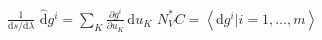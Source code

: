 \documentclass{article}
\begin{document}
$\frac{1}{\mathrm{d}s/\mathrm{d}\lambda}$
$\hat{\mathrm{d}}g^i=\sum_K\frac{\partial g^i}{\partial u_K}\,\mathrm{d}u_K$
$N^\ast_VC=\left<\mathrm{d}g^i|i=1,\dots,m\right>$
\end{document}
